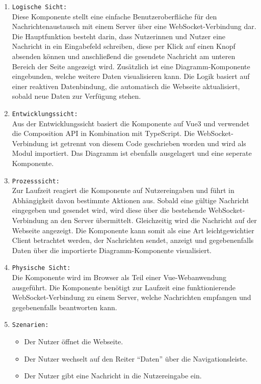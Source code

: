 \begin{enumerate}
  \item \texttt{Logische Sicht:} \\
  Diese Komponente stellt eine einfache Benutzeroberfläche für den Nachrichtenaustausch mit einem Server
  über eine WebSocket-Verbindung dar.
  Die Hauptfunktion besteht darin, dass Nutzerinnen und Nutzer eine Nachricht
  in ein Eingabefeld schreiben, diese per Klick auf einen Knopf absenden können und 
  anschließend die gesendete Nachricht am unteren Bereich der Seite angezeigt wird.
  Zusätzlich ist eine Diagramm-Komponente eingebunden, 
  welche weitere Daten visualisieren kann.
  Die Logik basiert auf einer reaktiven Datenbindung, die automatisch die Webseite aktualisiert,
  sobald neue Daten zur Verfügung stehen.
  \item \texttt{Entwicklungssicht:} \\
  Aus der Entwicklungssicht basiert die Komponente auf Vue3 und verwendet die Composition API
  in Kombination mit TypeScript.
  Die WebSocket-Verbindung ist getrennt von diesem Code geschrieben worden und wird als Modul importiert.
  Das Diagramm ist ebenfalls ausgelagert und eine seperate Komponente. 
  \item \texttt{Prozesssicht:} \\
  Zur Laufzeit reagiert die Komponente auf Nutzereingaben und führt in Abhängigkeit davon bestimmte
  Aktionen aus. Sobald eine gültige Nachricht eingegeben und gesendet wird, 
  wird diese über die bestehende WebSocket-Verbindung an den Server übermittelt. 
  Gleichzeitig wird die Nachricht auf der Webseite angezeigt.
  Die Komponente kann somit als eine Art leichtgewichtier Client betrachtet werden, 
  der Nachrichten sendet, anzeigt und gegebenenfalls Daten über die importierte Diagramm-Komponente visualisiert. 
  \item \texttt{Physische Sicht:} \\
  Die Komponente wird im Browser als Teil einer Vue-Webanwendung ausgeführt. 
  Die Komponente benötigt zur Laufzeit eine funktionierende WebSocket-Verbindung zu einem Server,
  welche Nachrichten empfangen und gegebenenfalls beantworten kann.
  \item \texttt{Szenarien:} \\
    \begin{itemize}
      \renewcommand{\labelitemi}{$\Rightarrow$}
    \item Der Nutzer öffnet die Webseite.
    \item Der Nutzer wechselt auf den Reiter ``Daten'' über die Navigationsleiste.
    \item Der Nutzer gibt eine Nachricht in die Nutzereingabe ein. 
    \end{itemize}
\end{enumerate}

